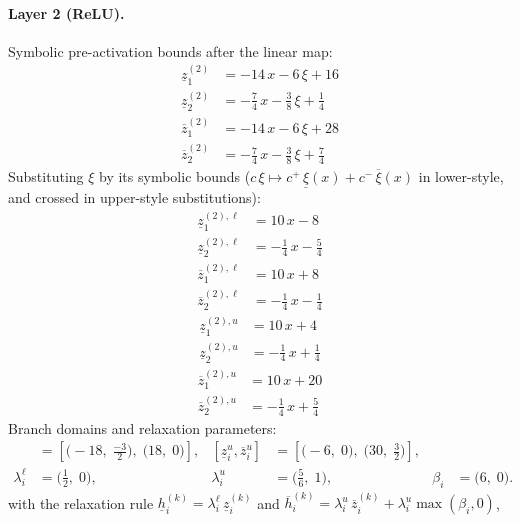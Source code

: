 \documentclass[11pt]{article}
\begin{document}
\paragraph{Layer 2 (ReLU).}
Symbolic pre-activation bounds after the linear map:
\begin{align*}
\underline{z}^{(2)}_{1} &= -14\,x - 6\,\xi + 16 \\
\underline{z}^{(2)}_{2} &= -\frac{7}{4}\,x - \frac{3}{8}\,\xi + \frac{1}{4}
\end{align*}
\begin{align*}
\overline{z}^{(2)}_{1} &= -14\,x - 6\,\xi + 28 \\
\overline{z}^{(2)}_{2} &= -\frac{7}{4}\,x - \frac{3}{8}\,\xi + \frac{7}{4}
\end{align*}
Substituting $\xi$ by its symbolic bounds ($c\,\xi \mapsto c^{+}\,\underline{\xi}(x) + c^{-}\,\overline{\xi}(x)$ in lower-style, and crossed in upper-style substitutions):
\begin{align*}
\underline{z}^{(2),\ell}_{1} &= 10\,x - 8 \\
\underline{z}^{(2),\ell}_{2} &= -\frac{1}{4}\,x - \frac{5}{4}
\end{align*}
\begin{align*}
\overline{z}^{(2),\ell}_{1} &= 10\,x + 8 \\
\overline{z}^{(2),\ell}_{2} &= -\frac{1}{4}\,x - \frac{1}{4}
\end{align*}
\begin{align*}
\underline{z}^{(2),u}_{1} &= 10\,x + 4 \\
\underline{z}^{(2),u}_{2} &= -\frac{1}{4}\,x + \frac{1}{4}
\end{align*}
\begin{align*}
\overline{z}^{(2),u}_{1} &= 10\,x + 20 \\
\overline{z}^{(2),u}_{2} &= -\frac{1}{4}\,x + \frac{5}{4}
\end{align*}
Branch domains and relaxation parameters:
\begin{align*}
[\underline{z}^{\ell}_i, \overline{z}^{\ell}_i] &= [\bigl(-18,\; \frac{-3}{2}\bigr),\; \bigl(18,\; 0\bigr)], & [\underline{z}^{u}_i, \overline{z}^{u}_i] &= [\bigl(-6,\; 0\bigr),\; \bigl(30,\; \frac{3}{2}\bigr)], \\
\lambda^{\ell}_i &= \bigl(\frac{1}{2},\; 0\bigr), & \lambda^{u}_i &= \bigl(\frac{5}{6},\; 1\bigr), & \beta_i &= \bigl(6,\; 0\bigr).
\end{align*}
with the relaxation rule
$\underline{h}^{(k)}_i = \lambda^{\ell}_i\, \underline{z}^{(k)}_i$ and
$\overline{h}^{(k)}_i = \lambda^{u}_i\, \overline{z}^{(k)}_i + \lambda^{u}_i \max(\beta_i, 0)$,
\end{document}
